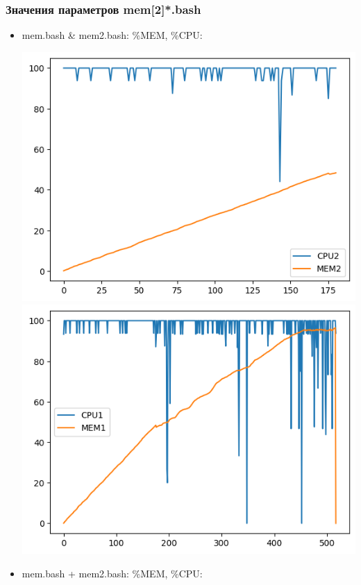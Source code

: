 \documentclass[10pt, a4paper]{article}
\begin{document}
\subsubsection*{Значения параметров mem[2]*.bash }

\begin{itemize}
    \item mem.bash \& mem2.bash: \%MEM, \%CPU:

    \includegraphics[scale=0.5]{graphs/5.png}
    \includegraphics[scale=0.5]{graphs/4.png}
    \item mem.bash + mem2.bash: \%MEM, \%CPU:


\end{itemize}
\end{document}
